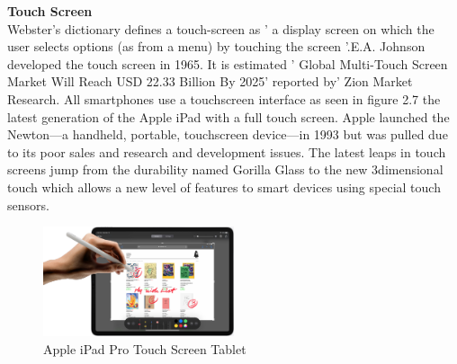\textbf{Touch Screen}\\

Webster's dictionary defines a touch-screen as ' a display screen on which the user selects options (as from a menu) by touching the screen '.E.A. Johnson developed the touch screen in 1965. It is estimated ' Global Multi-Touch Screen Market Will Reach USD 22.33 Billion By 2025' reported by' Zion Market Research. All smartphones use a touchscreen interface as seen in figure 2.7 the latest generation of the Apple iPad with a full touch screen. Apple launched the Newton—a handheld, portable, touchscreen device—in 1993 but was pulled due to its poor sales and research and development issues. The latest leaps in touch screens jump from the durability named Gorilla Glass to the new 3dimensional touch which allows a new level of features to smart devices using special touch sensors.

 
\begin{figure}[h!]
  \centering
    \includegraphics[width=0.5\textwidth]{Research-Latex/images/ipadProTouchScreen.jpg}
     \caption{Apple iPad Pro Touch Screen Tablet }
\end{figure}